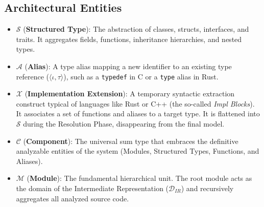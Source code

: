 \subsection{Architectural Entities}
\begin{itemize}
    \item $\mathcal{S}$ (\textbf{Structured Type}): The abstraction of classes, structs, interfaces, and traits. It aggregates fields, functions, inheritance hierarchies, and nested types.
    \item $\mathcal{A}$ (\textbf{Alias}): A type alias mapping a new identifier to an existing type reference ($\langle \iota, \tau \rangle$), such as a \texttt{typedef} in C or a \texttt{type} alias in Rust.
    \item $\mathcal{X}$ (\textbf{Implementation Extension}): A temporary syntactic extraction construct typical of languages like Rust or C++ (the so-called \textit{Impl Blocks}). It associates a set of functions and aliases to a target type. It is flattened into $\mathcal{S}$ during the Resolution Phase, disappearing from the final model.
    \item $\mathcal{C}$ (\textbf{Component}): The universal sum type that embraces the definitive analyzable entities of the system (Modules, Structured Types, Functions, and Aliases).
    \item $\mathcal{M}$ (\textbf{Module}): The fundamental hierarchical unit. The root module acts as the domain of the Intermediate Representation ($\mathcal{D}_{IR}$) and recursively aggregates all analyzed source code.
\end{itemize}

